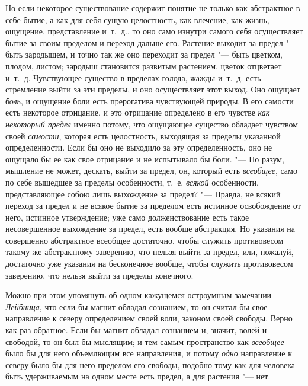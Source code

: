 Но если некоторое существование содержит понятие не только как абстрактное
в-себе-бытие, а как для-себя-сущую целостность, как влечение, как жизнь,
ощущение, представление и~т.~д., то оно само изнутри самого себя
осуществляет бытие за своим пределом и переход дальше его. Растение выходит
за предел "--- быть зародышем, и точно так же оно переходит за предел "--- быть
цветком, плодом, листом; зародыш становится развитым растением, цветок
отцветает и~т.~д. Чувствующее существо в пределах голода, жажды и~т.~д.
есть стремление выйти за эти пределы, и оно осуществляет этот выход. Оно
ощущает {\em боль}, и ощущение боли есть прерогатива
чувствующей природы. В его самости есть некоторое отрицание, и это
отрицание определено в его чувстве {\em как некоторый
предел} именно потому, что ощущающее существо обладает чувством своей
{\em самости}, которая есть целостность, выходящая за
пределы указанной определенности. Если бы оно не выходило за эту
определенность, оно не ощущало бы ее как свое отрицание и не испытывало бы
боли. "--- Но разум, мышление не может, дескать, выйти за предел, он, который
есть {\em всеобщее}, само по себе вышедшее за пределы
особенности, т.~е. {\em всякой} особенности,
представляющее собою лишь выхождение за предел? "--- Правда, не всякий переход
за предел и не всякое бытие за пределом есть истинное освобождение от него,
истинное утверждение; уже само долженствование есть такое несовершенное
выхождение за предел, есть вообще абстракция. Но указания на совершенно
абстрактное всеобщее достаточно, чтобы служить противовесом такому же
абстрактному заверению, что нельзя выйти за предел, или, пожалуй,
достаточно уже указания на бесконечное вообще, чтобы служить противовесом
заверению, что нельзя выйти за пределы конечного.

Можно при этом упомянуть об одном кажущемся остроумным замечании
{\em Лейбница}, что если бы магнит обладал сознанием,
то он считал бы свое направление к северу определением своей воли, законом
своей свободы. Верно как раз
обратное. Если бы магнит обладал сознанием и, значит, волей и свободой, то
он был бы мыслящим; и тем самым пространство как
{\em всеобщее} было бы для него объемлющим все
направления, и потому {\em одно} направление к северу
было бы для него пределом его свободы, подобно тому как для человека быть
удерживаемым на одном месте есть предел, а для растения "--- нет.

